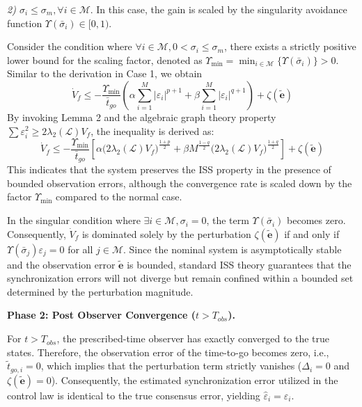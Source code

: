 \documentclass[lettersize,journal]{IEEEtran}
\begin{document}
\textit{2) ${\sigma}_i \leq {\sigma}_m, \forall i \in \mathcal{M}$}. In this case, the gain is scaled by the singularity avoidance function $\Upsilon(\bar{\sigma}_i) \in [0, 1)$.

Consider the condition where $\forall i \in \mathcal{M}, 0 < \sigma_i \le \sigma_m$, there exists a strictly positive lower bound for the scaling factor, denoted as $\Upsilon_{\min} = \min_{i \in \mathcal{M}} \{ \Upsilon(\bar{\sigma}_i) \} > 0$. Similar to the derivation in Case 1, we obtain
\begin{equation}
	\dot{V}_f \leq -\frac{\Upsilon_{\min}}{\bar{t}_{go}}
	\left(
	\alpha \sum_{i=1}^{M} \left| \varepsilon_i \right|^{p+1}
	+ \beta \sum_{i=1}^{M} \left| \varepsilon_i \right| ^{q+1}
	\right)
	+ \zeta (\tilde{\mathbf{e}})
\end{equation}
By invoking Lemma 2 and the algebraic graph theory property $\sum \varepsilon_i^2 \ge 2\lambda_2(\mathcal{L})V_f$, the inequality is derived as:
\begin{equation}
	\dot{V}_f \leq -\frac{\Upsilon_{\min}}{\bar{t}_{go}}
	\left[
	\alpha \bigl(2\lambda_2(\mathcal{L}) V_f\bigr)^{\frac{1+p}{2}}
	+ \beta M^{\frac{1-q}{2}}
	\bigl(2\lambda_2(\mathcal{L}) V_f\bigr)^{\frac{1+q}{2}}
	\right]
	+ \zeta(\tilde{\mathbf{e}})
\end{equation}
This indicates that the system preserves the ISS property in the presence of bounded observation errors, although the convergence rate is scaled down by the factor $\Upsilon_{\min}$ compared to the normal case.

In the singular condition where $\exists i \in \mathcal{M}, \sigma_i = 0$, the term $\Upsilon(\bar{\sigma}_i)$ becomes zero. Consequently, $\dot{V}_f$ is dominated solely by the perturbation $\zeta(\tilde{\mathbf{e}})$ if and only if $\Upsilon(\bar{\sigma}_j) \varepsilon_j = 0$ for all $j \in \mathcal{M}$. Since the nominal system is asymptotically stable and the observation error $\tilde{\mathbf{e}}$ is bounded, standard ISS theory guarantees that the synchronization errors will not diverge but remain confined within a bounded set determined by the perturbation magnitude.



\textbf{Phase 2: Post Observer Convergence ($t > T_{obs}$).} 

For $t > T_{obs}$, the prescribed-time observer has exactly converged to the true states. Therefore, the observation error of the time-to-go becomes zero, i.e., $\tilde{t}_{go,i} = 0$, which implies that the perturbation term strictly vanishes ($\Delta_i = 0$ and $\zeta(\tilde{\mathbf{e}}) = 0$). Consequently, the estimated synchronization error utilized in the control law is identical to the true consensus error, yielding $\hat{\varepsilon}_i = \varepsilon_i$.
\end{document}
